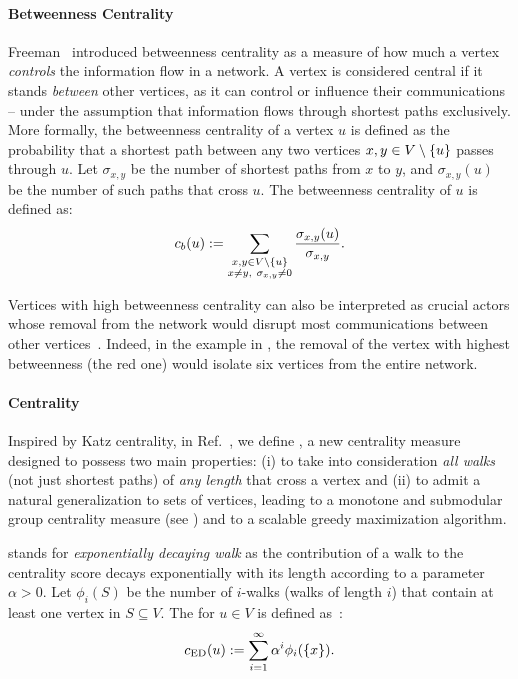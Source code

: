 \paragraph{Betweenness Centrality}
%
Freeman~\cite{freeman1977set} introduced betweenness centrality as a measure of
how much a vertex \emph{controls} the information flow in a network. A vertex
is considered central if it stands \emph{between} other vertices, as it can
control or influence their communications -- under the assumption that
information flows through shortest paths exclusively.
%
More formally, the betweenness centrality of a vertex $u$ is defined as
the probability that a shortest path between any two vertices $x,y \in V
\setminus \set{u}$ passes through $u$.
Let $\sigma_{x,y}$ be the number of shortest paths from $x$ to $y$, and
$\sigma_{x,y}(u)$ be the number of such paths that cross $u$. The betweenness
centrality of $u$ is defined as:
%
\begin{equation}
\label{eq:def:betweenness}
\betw(u) := \sum_{\substack{x,y \in V \setminus \set{u}\\x\neq y,\ \sigma_{x,y} \neq 0}}
\frac{\sigma_{x,y}(u)}{\sigma_{x,y}}.
\end{equation}

Vertices with high betweenness centrality can also be interpreted
as crucial actors whose removal from the network would disrupt most
communications between other vertices~\cite{DBLP:journals/snam/BoldiRV13}.
Indeed, in the example in , the removal of
the vertex with highest betweenness (the red one) would isolate six
vertices from the entire network.


\paragraph{\edw Centrality}
Inspired by Katz centrality, in Ref.~\cite{DBLP:conf/alenex/AngrimanGBZGM20}, we
define \edw, a new centrality measure designed to possess two main
properties: (i) to take into consideration \emph{all walks} (not just shortest
paths) of \emph{any length} that cross a vertex and (ii) to admit a natural
generalization to sets of vertices, leading to a monotone and submodular
group centrality measure (see )
and to a scalable greedy maximization algorithm.

\edw stands for \emph{exponentially decaying walk} as the contribution of a walk
to the centrality score decays exponentially with its length according to
a parameter $\alpha > 0$.
Let $\phi_i(S)$ be the number of $i$-walks (\ie walks of length $i$) that
contain at least one vertex in $S\subseteq V$. The \edw for $u\in V$ is defined
as~\cite{DBLP:conf/alenex/AngrimanGBZGM20}:
%
\[
\ed(u) := \sum_{i = 1}^{\infty}\alpha^i \phi_i(\set{x}).
\]

